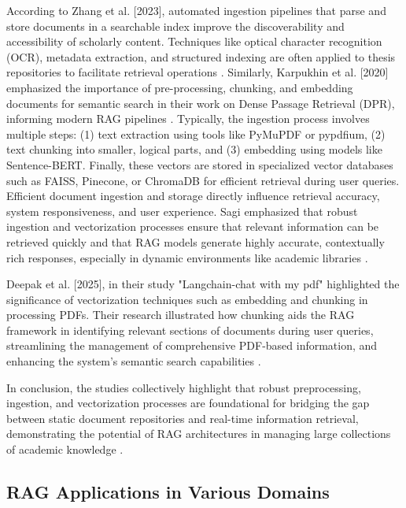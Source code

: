 \begin{refsection}
\bigbreak
\hspace{0.4cm}According to Zhang et al. [2023], automated ingestion pipelines that parse and store documents in a searchable index improve the discoverability and accessibility of scholarly content. Techniques like optical character recognition (OCR), metadata extraction, and structured indexing are often applied to thesis repositories to facilitate retrieval operations \cite{zhang2023automated}. Similarly, Karpukhin et al. [2020] emphasized the importance of pre-processing, chunking, and embedding documents for semantic search in their work on Dense Passage Retrieval (DPR), informing modern RAG pipelines \cite{karpukhin2020dense}. Typically, the ingestion process involves multiple steps: (1) text extraction using tools like PyMuPDF or pypdfium, (2) text chunking into smaller, logical parts, and (3) embedding using models like Sentence-BERT. Finally, these vectors are stored in specialized vector databases such as FAISS, Pinecone, or ChromaDB for efficient retrieval during user queries. Efficient document ingestion and storage directly influence retrieval accuracy, system responsiveness, and user experience. Sagi emphasized that robust ingestion and vectorization processes ensure that relevant information can be retrieved quickly and that RAG models generate highly accurate, contextually rich responses, especially in dynamic environments like academic libraries \cite{karpukhin2020dense}. 
 

\bigbreak
\hspace{0.4cm}Deepak et al. [2025], in their study "Langchain-chat with my pdf" highlighted the significance of vectorization techniques such as embedding and chunking in processing PDFs. Their research illustrated how chunking aids the RAG framework in identifying relevant sections of documents during user queries, streamlining the management of comprehensive PDF-based information, and enhancing the system's semantic search capabilities \cite{deepak2025langchain}.

\bigbreak
\hspace{0.4cm}In conclusion, the studies collectively highlight that robust preprocessing, ingestion, and vectorization processes are foundational for bridging the gap between static document repositories and real-time information retrieval, demonstrating the potential of RAG architectures in managing large collections of academic knowledge \cite{allu2024beyond} \cite{aquino2024extracting}.


\subsection{RAG Applications in Various Domains}


\end{refsection}
